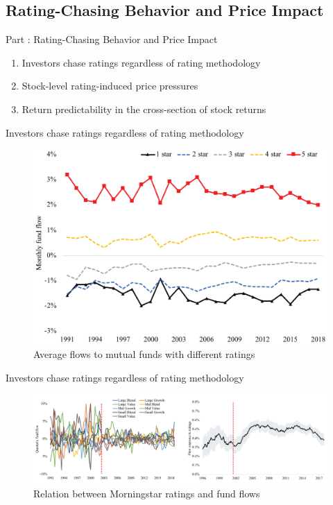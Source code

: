 \documentclass[UTF8, 16pt]{beamer}
\begin{document}
\begin{CJK*}{UTF8}{gbsn}
\subsection{Rating-Chasing Behavior and Price Impact}

\begin{frame}{Part \uppercase\expandafter{}: Rating-Chasing Behavior and Price Impact}
	 \begin{enumerate}
	 	\item Investors chase ratings regardless of rating methodology
	 	\item Stock-level rating-induced price pressures
	 	\item Return predictability in the cross-section of stock returns
	 \end{enumerate}
\end{frame}

\begin{frame}{Investors chase ratings regardless of rating methodology}
	\begin{figure}[htpb]
	  \begin{center}
	    \includegraphics[width=0.85 \linewidth]
	    {pic/fund_flow_by_rating.png}
	  \end{center}
	  \caption{Average flows to mutual funds with different ratings}
	\end{figure}
\end{frame}

\begin{frame}{Investors chase ratings regardless of rating methodology}
	\begin{figure}[htpb]
	  \begin{center}
	    \includegraphics[width=1.06  \linewidth]
	    {pic/fund_flow_change.png}
	  \end{center}
	  \caption{Relation between Morningstar ratings and fund flows}
	\end{figure}
\end{frame}


\end{CJK*}
\end{document}
